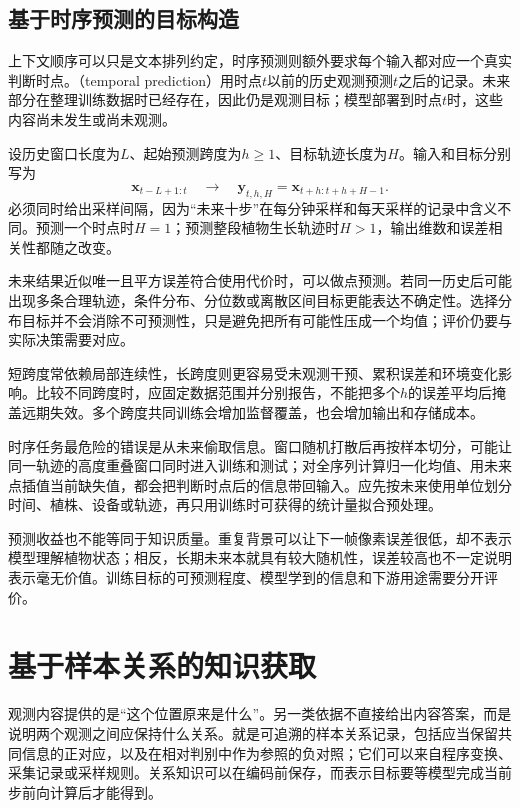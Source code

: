 \subsection{基于时序预测的目标构造}
\label{sec:data-derived-knowledge-temporal-prediction}

上下文顺序可以只是文本排列约定，时序预测则额外要求每个输入都对应一个真实判断时点。（temporal prediction）用时点$t$以前的历史观测预测$t$之后的记录。未来部分在整理训练数据时已经存在，因此仍是观测目标；模型部署到时点$t$时，这些内容尚未发生或尚未观测。

设历史窗口长度为$L$、起始预测跨度为$h\geq1$、目标轨迹长度为$H$。输入和目标分别写为
\begin{equation}
  \bm{x}_{t-L+1:t}
  \quad\longrightarrow\quad
  \bm{y}_{t,h,H}
  =\bm{x}_{t+h:t+h+H-1}.
  \label{eq:data-derived-knowledge-temporal-windows}
\end{equation}
必须同时给出采样间隔，因为“未来十步”在每分钟采样和每天采样的记录中含义不同。预测一个时点时$H=1$；预测整段植物生长轨迹时$H>1$，输出维数和误差相关性都随之改变。

未来结果近似唯一且平方误差符合使用代价时，可以做点预测。若同一历史后可能出现多条合理轨迹，条件分布、分位数或离散区间目标更能表达不确定性。选择分布目标并不会消除不可预测性，只是避免把所有可能性压成一个均值；评价仍要与实际决策需要对应。

短跨度常依赖局部连续性，长跨度则更容易受未观测干预、累积误差和环境变化影响。比较不同跨度时，应固定数据范围并分别报告，不能把多个$h$的误差平均后掩盖远期失效。多个跨度共同训练会增加监督覆盖，也会增加输出和存储成本。

时序任务最危险的错误是从未来偷取信息。窗口随机打散后再按样本切分，可能让同一轨迹的高度重叠窗口同时进入训练和测试；对全序列计算归一化均值、用未来点插值当前缺失值，都会把判断时点后的信息带回输入。应先按未来使用单位划分时间、植株、设备或轨迹，再只用训练时可获得的统计量拟合预处理。

预测收益也不能等同于知识质量。重复背景可以让下一帧像素误差很低，却不表示模型理解植物状态；相反，长期未来本就具有较大随机性，误差较高也不一定说明表示毫无价值。训练目标的可预测程度、模型学到的信息和下游用途需要分开评价。

\section{基于样本关系的知识获取}
\label{sec:data-derived-knowledge-relations}

观测内容提供的是“这个位置原来是什么”。另一类依据不直接给出内容答案，而是说明两个观测之间应保持什么关系。就是可追溯的样本关系记录，包括应当保留共同信息的正对应，以及在相对判别中作为参照的负对照；它们可以来自程序变换、采集记录或采样规则。关系知识可以在编码前保存，而表示目标要等模型完成当前步前向计算后才能得到。

